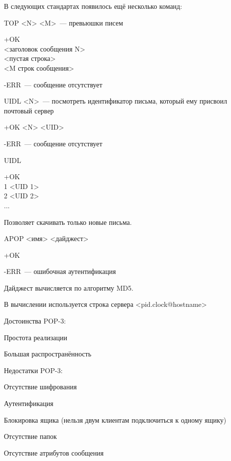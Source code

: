 В следующих стандартах появилось ещё несколько команд:

TOP <N> <M>~--- превьюшки писем
\begin{MyItemize}
    \item +OK\\
    <заголовок сообщения N>\\
    <пустая строка>\\
    <M строк сообщения>
    \item -ERR~--- сообщение отсутствует
\end{MyItemize} 

UIDL <N>~--- посмотреть идентификатор письма, который ему присвоил почтовый сервер
\begin{MyItemize}
    \item +OK <N> <UID>
    \item -ERR~--- сообщение отсутствует
\end{MyItemize} 

UIDL
\begin{MyItemize}
    \item +OK\\
    1 <UID 1>\\
    2 <UID 2>\\
    ...
\end{MyItemize} 

Позволяет скачивать только новые письма.

APOP <имя> <дайджест>
\begin{MyItemize}
    \item +OK
    \item -ERR~--- ошибочная аутентификация
\end{MyItemize} 

Дайджест вычисляется по алгоритму MD5.

В вычислении используется строка сервера <pid.clock@hostname>

Достоинства POP-3:
\begin{MyItemize}
    \item Простота реализации
    \item Большая распространённость
\end{MyItemize}

Недостатки POP-3:
\begin{MyItemize}
    \item Отсутствие шифрования
    \item Аутентификация
    \item Блокировка ящика (нельзя двум клиентам подключиться к одному ящику)
    \item Отсутствие папок
    \item Отсутствие атрибутов сообщения
\end{MyItemize}

